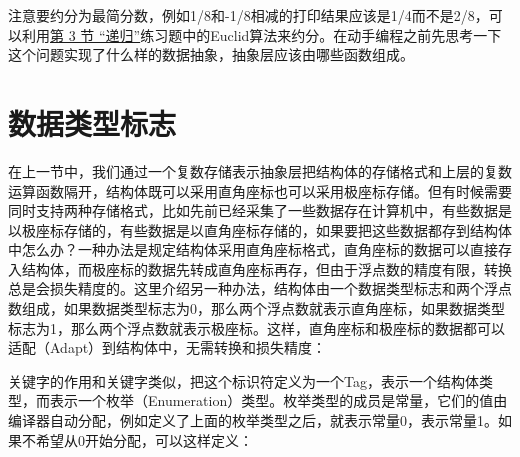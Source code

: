 

注意要约分为最简分数，例如1/\BookSplit{}8和-1/\BookSplit{}8相减的打印结果应该是1/\BookSplit{}4而不是2/\BookSplit{}8，可以利用\hyperlink{db.ch05s03.id2722951}{第 3 节 “递归”}练习题中的Euclid算法来约分。在动手编程之前先思考一下这个问题实现了什么样的数据抽象，抽象层应该由哪些函数组成。




\section{数据类型标志}
%
在上一节中，我们通过一个复数存储表示抽象层把结构体的存储格式和上层的复数运算函数隔开，结构体既可以采用直角座标也可以采用极座标存储。但有时候需要同时支持两种存储格式，比如先前已经采集了一些数据存在计算机中，有些数据是以极座标存储的，有些数据是以直角座标存储的，如果要把这些数据都存到结构体中怎么办？一种办法是规定结构体采用直角座标格式，直角座标的数据可以直接存入结构体，而极座标的数据先转成直角座标再存，但由于浮点数的精度有限，转换总是会损失精度的。这里介绍另一种办法，结构体由一个数据类型标志和两个浮点数组成，如果数据类型标志为0，那么两个浮点数就表示直角座标，如果数据类型标志为1，那么两个浮点数就表示极座标。这样，直角座标和极座标的数据都可以适配（Adapt）到结构体中，无需转换和损失精度：




关键字的作用和关键字类似，把这个标识符定义为一个Tag，表示一个结构体类型，而表示一个枚举（Enumeration）类型。枚举类型的成员是常量，它们的值由编译器自动分配，例如定义了上面的枚举类型之后，就表示常量0，表示常量1。如果不希望从0开始分配，可以这样定义：


